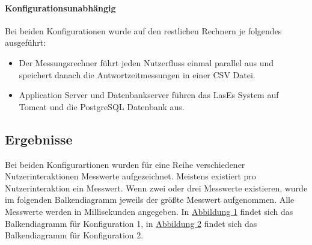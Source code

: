 \paragraph{Konfigurationsunabhängig\\}
Bei beiden Konfigurationen wurde auf den restlichen Rechnern je folgendes ausgeführt:
\begin{itemize}
	\item Der Messungsrechner führt jeden Nutzerfluss einmal parallel aus und speichert danach die Antwortzeitmessungen in einer CSV Datei.
	\item Application Server und Datenbankserver führen das LasEs System auf Tomcat und die PostgreSQL Datenbank aus.
\end{itemize}

\subsection{Ergebnisse}

Bei beiden Konfigurartionen wurden für eine Reihe verschiedener Nutzerinteraktionen Messwerte aufgezeichnet. Meistens existiert pro Nutzerinteraktion ein Messwert. Wenn zwei oder drei Messwerte existieren, wurde im folgenden Balkendiagramm jeweils der größte Messwert aufgenommen. Alle Messwerte werden in Millisekunden angegeben. In \hyperref[fig:worst30]{Abbildung 1} findet sich das Balkendiagramm für Konfiguration 1, in \hyperref[fig:worst50]{Abbildung 2} findet sich das Balkendiagramm für Konfiguration 2.

